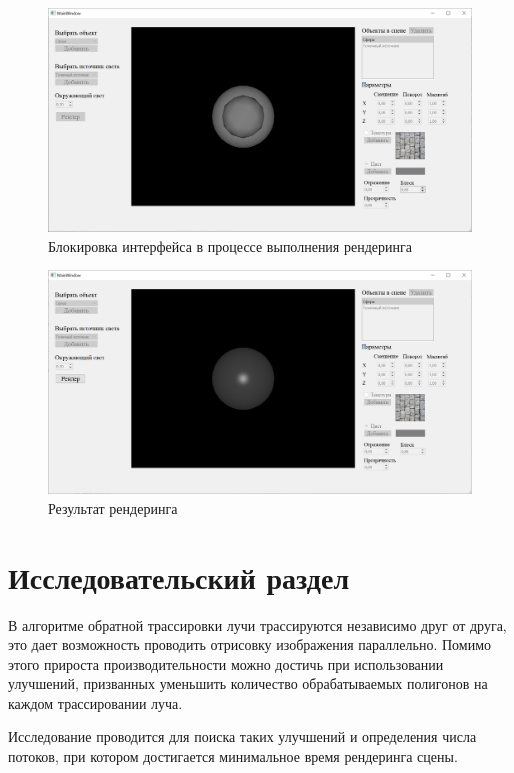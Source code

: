 \documentclass[12pt,a4paper,oneside]{report}
\begin{document}
	\begin{figure}[h]
		\centering
		\includegraphics[scale = 0.5]{wait}
		\caption{Блокировка интерфейса в процессе выполнения рендеринга}
	\end{figure}

	\begin{figure}[h]
		\centering
		\includegraphics[scale = 0.5]{release}
		\caption{Результат рендеринга}
	\end{figure}
	
	
	\chapter{Исследовательский раздел}
	 \quad В алгоритме обратной трассировки лучи трассируются независимо друг от друга, это дает возможность проводить отрисовку изображения параллельно. Помимо этого прироста производительности можно достичь при использовании улучшений, призванных уменьшить количество обрабатываемых полигонов на каждом трассировании луча.
	
	Исследование проводится для поиска таких улучшений и определения числа потоков, при котором достигается минимальное время рендеринга сцены.
	
\end{document}
